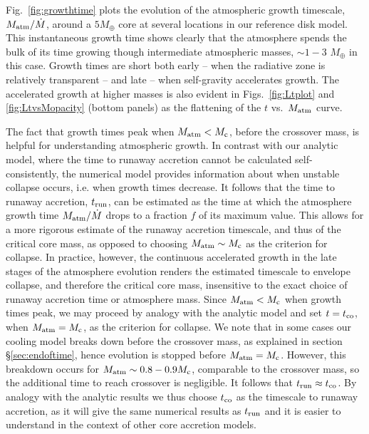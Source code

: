 \documentclass[apj, numberedappendix]{emulateapj}
\newcommand{\Fig}[1]{Fig.~\ref{#1}}
\newcommand{\Figs}[2]{Figs.~\ref{#1} and \ref{#2}}
\newcommand{\co}{_{\rm c}}
\begin{document}
\Fig{fig:growthtime} plots the evolution of the atmospheric growth timescale, $M_{\rm atm}/\dot{M}$,  around a $5 M_{\oplus}$ core at several locations in our reference disk model.  This instantaneous growth time shows clearly that the atmosphere spends the bulk of its time growing though intermediate atmospheric masses, $\sim 1 -3$ $M_\oplus$ in this case.  Growth times are short both early -- when the radiative zone is relatively transparent -- and late -- when self-gravity accelerates growth.  The accelerated growth at higher masses is also evident in \Figs{fig:Ltplot}{fig:LtvsMopacity} (bottom panels) as the flattening of the $t$ vs.\ $M_{\rm atm}$ curve.  

The fact that growth times peak when $M_{\rm{atm}} < M_{\rm c}$, before the crossover mass, is helpful for understanding atmospheric growth. In contrast with our analytic model, where the time to runaway accretion cannot be calculated self-consistently, the numerical model provides information about when unstable collapse occurs, i.e. when growth times decrease. It follows that the time to runaway accretion, $t_{\rm run}$, can be estimated as the time at which the atmosphere growth time $M_{\rm atm}/\dot{M}$ drops to a fraction $f$ of its maximum value. This allows for a more rigorous estimate of the runaway accretion timescale, and thus of the critical core mass, as opposed to choosing $M_{\rm atm} \sim M\co$ as the criterion for collapse. In practice, however, the continuous accelerated growth in the late stages of the atmosphere evolution renders the estimated timescale to envelope collapse, and therefore the critical core mass, insensitive to the exact choice of runaway accretion time or atmosphere mass.  Since $M_{\rm atm} < M\co$ when growth times peak, we may proceed by analogy with the analytic model and set $t=t_{\rm co}$, when $M_{\rm atm}=M\co$, as the criterion for collapse. We note that in some cases our cooling model breaks down before the crossover mass, as explained in section \S\ref{sec:endoftime}, hence evolution is stopped before $M_{\rm atm}=M\co$. However, this breakdown occurs for $M_{\rm atm} \sim 0.8-0.9 M\co$, comparable to the crossover mass, so the additional time to reach crossover is negligible. It follows that $t_{\rm run} \approx t_{\rm co}$. By analogy with the analytic results we thus choose $t_{\rm co}$ as the timescale to runaway accretion, as it will give the same numerical results as $t_{\rm run}$ and it is easier to understand in the context of other core accretion models.

\end{document}
